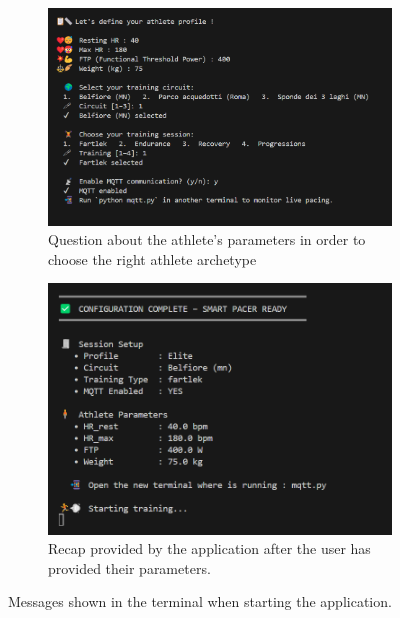 \begin{figure}[htbp]
    \centering
    \begin{subfigure}[t]{0.52\textwidth}
      \includegraphics[width=\textwidth]{images/question_main.png}
      \caption{Question about the athlete's parameters in order to choose the right athlete archetype}
      \label{fig:main_question}
    \end{subfigure}
    \begin{subfigure}[t]{0.45\textwidth}
      \centering
      \includegraphics[width=\textwidth]{images/recap_main.png}
      \caption{Recap provided by the application after the user has provided their parameters.}
      \label{fig:recap_main}
    \end{subfigure}
    
    \caption{Messages shown in the terminal when starting the application.}
  \end{figure}

